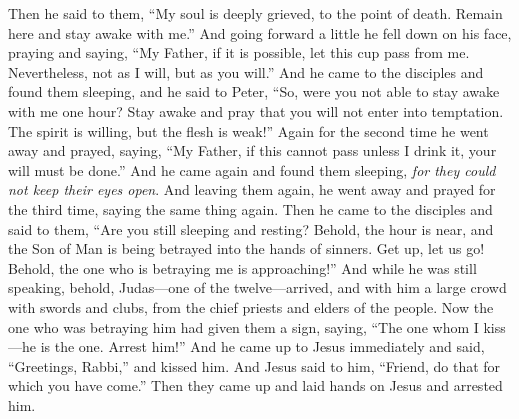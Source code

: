 \begin{biblechapter}
\verse Then he said to them, “My soul is deeply grieved, to the point of death. Remain here and stay awake with me.”
\verse And going forward a little he fell down on his face, praying and saying, “My Father, if it is possible, let this cup pass from me. Nevertheless, not as I will, but as you will.”
\verse And he came to the disciples and found them sleeping, and he said to Peter, “So, were you not able to stay awake with me one hour?
\verse Stay awake and pray that you will not enter into temptation. The spirit is willing, but the flesh is weak!”
\verse Again for the second time he went away and prayed, saying, “My Father, if this cannot pass unless I drink it, your will must be done.”
\verse And he came again and found them sleeping, \textit{for they could not keep their eyes open}.
\verse And leaving them again, he went away and prayed for the third time, saying the same thing again.
\verse Then he came to the disciples and said to them, “Are you still sleeping and resting? Behold, the hour is near, and the Son of Man is being betrayed into the hands of sinners.
\verse Get up, let us go! Behold, the one who is betraying me is approaching!”
 And while he was still speaking, behold, Judas—one of the twelve—arrived, and with him a large crowd with swords and clubs, from the chief priests and elders of the people.
\verse Now the one who was betraying him had given them a sign, saying, “The one whom I kiss—he is the one. Arrest him!”
\verse And he came up to Jesus immediately and said, “Greetings, Rabbi,” and kissed him.
\verse And Jesus said to him, “Friend, do that for which you have come.” Then they came up and laid hands on Jesus and arrested him.

\end{biblechapter}
